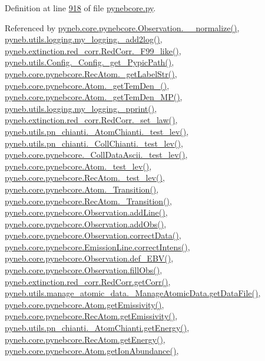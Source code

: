 Definition at line \hyperlink{pynebcore_8py_source_l00918}{918} of file \hyperlink{pynebcore_8py_source}{pynebcore.\+py}.



Referenced by \hyperlink{pynebcore_8py_source_l03885}{pyneb.\+core.\+pynebcore.\+Observation.\+\_\+\+\_\+normalize()}, \hyperlink{logging_8py_source_l00059}{pyneb.\+utils.\+logging.\+my\+\_\+logging.\+\_\+add2log()}, \hyperlink{red__corr_8py_source_l00658}{pyneb.\+extinction.\+red\+\_\+corr.\+Red\+Corr.\+\_\+\+F99\+\_\+like()}, \hyperlink{_config_8py_source_l00086}{pyneb.\+utils.\+Config.\+\_\+\+Config.\+\_\+get\+\_\+\+Pypic\+Path()}, \hyperlink{pynebcore_8py_source_l02854}{pyneb.\+core.\+pynebcore.\+Rec\+Atom.\+\_\+get\+Label\+Str()}, \hyperlink{pynebcore_8py_source_l01803}{pyneb.\+core.\+pynebcore.\+Atom.\+\_\+get\+Tem\+Den\+\_()}, \hyperlink{pynebcore_8py_source_l01980}{pyneb.\+core.\+pynebcore.\+Atom.\+\_\+get\+Tem\+Den\+\_\+\+M\+P()}, \hyperlink{logging_8py_source_l00051}{pyneb.\+utils.\+logging.\+my\+\_\+logging.\+\_\+pprint()}, \hyperlink{red__corr_8py_source_l00176}{pyneb.\+extinction.\+red\+\_\+corr.\+Red\+Corr.\+\_\+set\+\_\+law()}, \hyperlink{pn__chianti_8py_source_l00284}{pyneb.\+utils.\+pn\+\_\+chianti.\+\_\+\+Atom\+Chianti.\+\_\+test\+\_\+lev()}, \hyperlink{pn__chianti_8py_source_l00449}{pyneb.\+utils.\+pn\+\_\+chianti.\+\_\+\+Coll\+Chianti.\+\_\+test\+\_\+lev()}, \hyperlink{pynebcore_8py_source_l01026}{pyneb.\+core.\+pynebcore.\+\_\+\+Coll\+Data\+Ascii.\+\_\+test\+\_\+lev()}, \hyperlink{pynebcore_8py_source_l01459}{pyneb.\+core.\+pynebcore.\+Atom.\+\_\+test\+\_\+lev()}, \hyperlink{pynebcore_8py_source_l02596}{pyneb.\+core.\+pynebcore.\+Rec\+Atom.\+\_\+test\+\_\+lev()}, \hyperlink{pynebcore_8py_source_l01367}{pyneb.\+core.\+pynebcore.\+Atom.\+\_\+\+Transition()}, \hyperlink{pynebcore_8py_source_l02696}{pyneb.\+core.\+pynebcore.\+Rec\+Atom.\+\_\+\+Transition()}, \hyperlink{pynebcore_8py_source_l03436}{pyneb.\+core.\+pynebcore.\+Observation.\+add\+Line()}, \hyperlink{pynebcore_8py_source_l03467}{pyneb.\+core.\+pynebcore.\+Observation.\+add\+Obs()}, \hyperlink{pynebcore_8py_source_l03906}{pyneb.\+core.\+pynebcore.\+Observation.\+correct\+Data()}, \hyperlink{pynebcore_8py_source_l03325}{pyneb.\+core.\+pynebcore.\+Emission\+Line.\+correct\+Intens()}, \hyperlink{pynebcore_8py_source_l03861}{pyneb.\+core.\+pynebcore.\+Observation.\+def\+\_\+\+E\+B\+V()}, \hyperlink{pynebcore_8py_source_l03452}{pyneb.\+core.\+pynebcore.\+Observation.\+fill\+Obs()}, \hyperlink{red__corr_8py_source_l00211}{pyneb.\+extinction.\+red\+\_\+corr.\+Red\+Corr.\+get\+Corr()}, \hyperlink{manage__atomic__data_8py_source_l00297}{pyneb.\+utils.\+manage\+\_\+atomic\+\_\+data.\+\_\+\+Manage\+Atomic\+Data.\+get\+Data\+File()}, \hyperlink{pynebcore_8py_source_l01716}{pyneb.\+core.\+pynebcore.\+Atom.\+get\+Emissivity()}, \hyperlink{pynebcore_8py_source_l02873}{pyneb.\+core.\+pynebcore.\+Rec\+Atom.\+get\+Emissivity()}, \hyperlink{pn__chianti_8py_source_l00346}{pyneb.\+utils.\+pn\+\_\+chianti.\+\_\+\+Atom\+Chianti.\+get\+Energy()}, \hyperlink{pynebcore_8py_source_l02811}{pyneb.\+core.\+pynebcore.\+Rec\+Atom.\+get\+Energy()}, \hyperlink{pynebcore_8py_source_l02110}{pyneb.\+core.\+pynebcore.\+Atom.\+get\+Ion\+Abundance()}, 